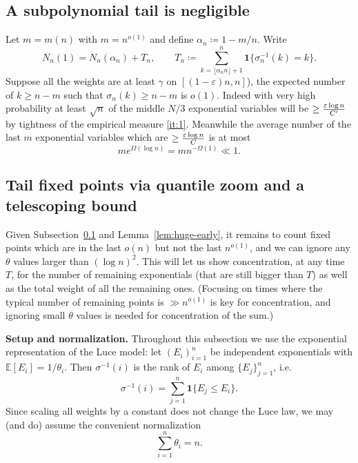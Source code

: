 \documentclass[10pt]{article}
\numberwithin{equation}{section}
\begin{document}
\subsection{A subpolynomial tail is negligible}
\label{subsec:subpoly}

Let $m=m(n)$ with $m=n^{o(1)}$ and define $\alpha_n\coloneqq 1-m/n$.
Write
\[
N_n(1)=N_n(\alpha_n)+T_n,
\qquad
T_n\coloneqq \sum_{k=\lfloor \alpha_n n\rfloor+1}^n \mathbf 1\{\sigma_n^{-1}(k)=k\}.
\]
Suppose all the weights are at least $\gamma$ on $[(1-\varepsilon)n,n]$),
the expected number of $k\geq n-m$ such that $\sigma_n(k)\geq n-m$ is $o(1)$.
Indeed with very high probability at least $\sqrt{n}$ of the middle $N/3$ exponential variables will be $\geq \frac{\varepsilon\log n}{C'}$ by tightness of the empirical measure \ref{it:1}. 
Meanwhile the average number of the last $m$ exponential variables which are $\geq \frac{\varepsilon\log n}{C}$ is at most 
\[
me^{\Omega(\log n)}=mn^{-\Omega(1)}\ll 1.
\]



     
     \subsection{Tail fixed points via quantile zoom and a telescoping bound}

     Given Subsection~\ref{subsec:subpoly} and Lemma~\ref{lem:huge-early}, it remains to count fixed points which are in the last $o(n)$ but not the last $n^{o(1)}$, and we can ignore any $\theta$ values larger than $(\log n)^2$.
    This will let us show concentration, at any time $T$, for the number of remaining exponentials (that are still bigger than $T$) as well as the total weight of all the remaining ones. 
    (Focusing on times where the typical number of remaining points is $\gg n^{o(1)}$ is key for concentration, and ignoring small $\theta$ values is needed for concentration of the sum.)

\textbf{Setup and normalization.}
Throughout this subsection we use the exponential representation of the Luce model:
let $(E_i)_{i=1}^n$ be independent exponentials with $\mathbb E[E_i]=1/\theta_i$.
Then $\sigma^{-1}(i)$ is the rank of $E_i$ among $\{E_j\}_{j=1}^n$, i.e.
\begin{equation}\label{eq:exp-repr}
\sigma^{-1}(i)=\sum_{j=1}^n \mathbf 1\{E_j\le E_i\}.
\end{equation}
Since scaling all weights by a constant does not change the Luce law, we may (and do)
assume the convenient normalization
\begin{equation}\label{eq:normalize}
\sum_{i=1}^n \theta_i = n.
\end{equation}
\end{document}
